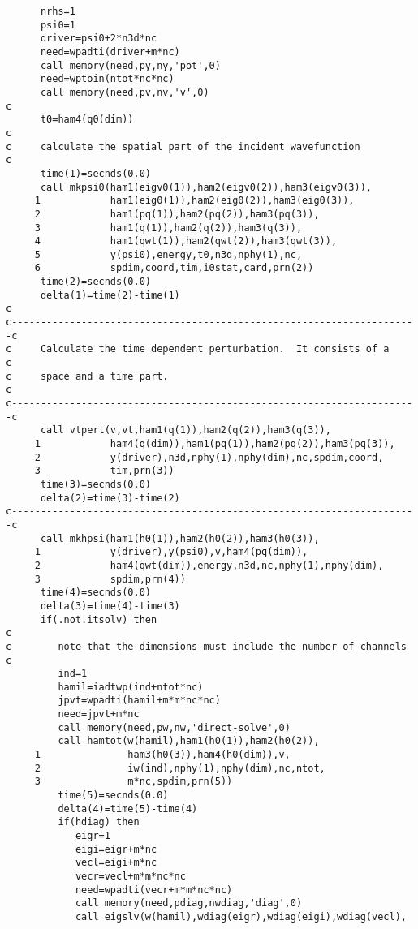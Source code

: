 \documentclass{article}
\begin{document}
\begin{verbatim}
      nrhs=1
      psi0=1 
      driver=psi0+2*n3d*nc
      need=wpadti(driver+m*nc)
      call memory(need,py,ny,'pot',0)
      need=wptoin(ntot*nc*nc)
      call memory(need,pv,nv,'v',0)
c                                                                      
      t0=ham4(q0(dim))
c
c     calculate the spatial part of the incident wavefunction
c
      time(1)=secnds(0.0)
      call mkpsi0(ham1(eigv0(1)),ham2(eigv0(2)),ham3(eigv0(3)),
     1            ham1(eig0(1)),ham2(eig0(2)),ham3(eig0(3)),
     2            ham1(pq(1)),ham2(pq(2)),ham3(pq(3)),
     3            ham1(q(1)),ham2(q(2)),ham3(q(3)),
     4            ham1(qwt(1)),ham2(qwt(2)),ham3(qwt(3)),
     5            y(psi0),energy,t0,n3d,nphy(1),nc,
     6            spdim,coord,tim,i0stat,card,prn(2))
      time(2)=secnds(0.0)
      delta(1)=time(2)-time(1)
c
c----------------------------------------------------------------------c
c     Calculate the time dependent perturbation.  It consists of a     c
c     space and a time part.                                           c
c----------------------------------------------------------------------c
      call vtpert(v,vt,ham1(q(1)),ham2(q(2)),ham3(q(3)),
     1            ham4(q(dim)),ham1(pq(1)),ham2(pq(2)),ham3(pq(3)),
     2            y(driver),n3d,nphy(1),nphy(dim),nc,spdim,coord,
     3            tim,prn(3))
      time(3)=secnds(0.0)
      delta(2)=time(3)-time(2)
c----------------------------------------------------------------------c
      call mkhpsi(ham1(h0(1)),ham2(h0(2)),ham3(h0(3)),
     1            y(driver),y(psi0),v,ham4(pq(dim)),
     2            ham4(qwt(dim)),energy,n3d,nc,nphy(1),nphy(dim),
     3            spdim,prn(4))
      time(4)=secnds(0.0)
      delta(3)=time(4)-time(3)
      if(.not.itsolv) then
c
c        note that the dimensions must include the number of channels
c
         ind=1
         hamil=iadtwp(ind+ntot*nc)
         jpvt=wpadti(hamil+m*m*nc*nc)
         need=jpvt+m*nc
         call memory(need,pw,nw,'direct-solve',0)
         call hamtot(w(hamil),ham1(h0(1)),ham2(h0(2)),
     1               ham3(h0(3)),ham4(h0(dim)),v,
     2               iw(ind),nphy(1),nphy(dim),nc,ntot,
     3               m*nc,spdim,prn(5))
         time(5)=secnds(0.0)
         delta(4)=time(5)-time(4)
         if(hdiag) then
            eigr=1
            eigi=eigr+m*nc
            vecl=eigi+m*nc
            vecr=vecl+m*m*nc*nc
            need=wpadti(vecr+m*m*nc*nc)
            call memory(need,pdiag,nwdiag,'diag',0)
            call eigslv(w(hamil),wdiag(eigr),wdiag(eigi),wdiag(vecl),

\end{verbatim}
\end{document}
